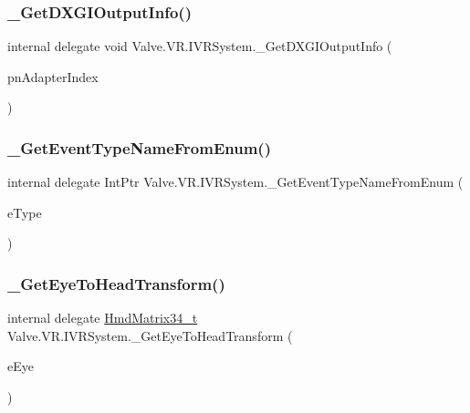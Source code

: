 \subsubsection{\texorpdfstring{\_GetDXGIOutputInfo()}{\_GetDXGIOutputInfo()}}
{\footnotesize\ttfamily internal delegate void Valve.\+V\+R.\+I\+V\+R\+System.\+\_\+\+Get\+D\+X\+G\+I\+Output\+Info (\begin{DoxyParamCaption}\item[{ref int}]{pn\+Adapter\+Index }\end{DoxyParamCaption})}

\mbox{\label{struct_valve_1_1_v_r_1_1_i_v_r_system_a31f48cf54b258ae76bcfc5444ee883c8}} 
\subsubsection{\texorpdfstring{\_GetEventTypeNameFromEnum()}{\_GetEventTypeNameFromEnum()}}
{\footnotesize\ttfamily internal delegate Int\+Ptr Valve.\+V\+R.\+I\+V\+R\+System.\+\_\+\+Get\+Event\+Type\+Name\+From\+Enum (\begin{DoxyParamCaption}\item[{\mbox{\hyperlink{namespace_valve_1_1_v_r_afe3398b9e5cb1ea06335142d1b9289f3}{E\+V\+R\+Event\+Type}}}]{e\+Type }\end{DoxyParamCaption})}

\mbox{\label{struct_valve_1_1_v_r_1_1_i_v_r_system_a285d2953403229712d9fa48bb3224d80}} 
\subsubsection{\texorpdfstring{\_GetEyeToHeadTransform()}{\_GetEyeToHeadTransform()}}
{\footnotesize\ttfamily internal delegate \mbox{\hyperlink{struct_valve_1_1_v_r_1_1_hmd_matrix34__t}{Hmd\+Matrix34\+\_\+t}} Valve.\+V\+R.\+I\+V\+R\+System.\+\_\+\+Get\+Eye\+To\+Head\+Transform (\begin{DoxyParamCaption}\item[{\mbox{\hyperlink{namespace_valve_1_1_v_r_a8153d4a3e627e1cede046327087c1880}{E\+V\+R\+Eye}}}]{e\+Eye }\end{DoxyParamCaption})}

